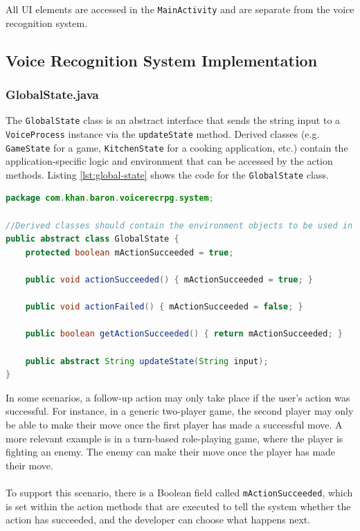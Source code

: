 \documentclass[12pt]{article}
\begin{document}
All UI elements are accessed in the \texttt{MainActivity} and are separate from the voice recognition system.

\subsection{Voice Recognition System Implementation}

\subsubsection{GlobalState.java}

The \texttt{GlobalState} class is an abstract interface that sends the string input to a \texttt{VoiceProcess} instance via the \texttt{updateState} method. Derived classes (e.g. \texttt{GameState} for a game, \texttt{KitchenState} for a cooking application, etc.) contain the application-specific logic and environment that can be accessed by the action methods. Listing \ref{lst:global-state} shows the code for the \texttt{GlobalState} class.

\begin{lstlisting}[language=Java, caption=GlobalState.java, label={lst:global-state}]
package com.khan.baron.voicerecrpg.system;

//Derived classes should contain the environment objects to be used in actions
public abstract class GlobalState {
    protected boolean mActionSucceeded = true;
    
    public void actionSucceeded() { mActionSucceeded = true; }
    
    public void actionFailed() { mActionSucceeded = false; }
    
    public boolean getActionSucceeded() { return mActionSucceeded; }
    
    public abstract String updateState(String input);
}
\end{lstlisting}

In some scenarios, a follow-up action may only take place if the user's action was successful. For instance, in a generic two-player game, the second player may only be able to make their move once the first player has made a successful move. A more relevant example is in a turn-based role-playing game, where the player is fighting an enemy. The enemy can make their move once the player has made their move.
\\
\\
To support this scenario, there is a Boolean field called \texttt{mActionSucceeded}, which is set within the action methods that are executed to tell the system whether the action has succeeded, and the developer can choose what happens next.
\end{document}
